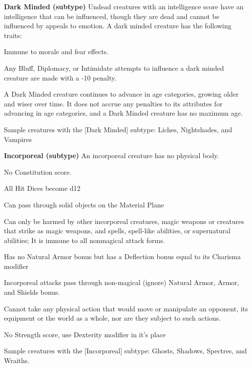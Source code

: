 \textbf{Dark Minded (subtype)}
Undead creatures with an intelligence score have an intelligence that can be influenced, though they are dead and cannot be influenced by appeals to emotion. A dark minded creature has the following traits:
\begin{itemize*}
\item Immune to morale and fear effects.
\item Any Bluff, Diplomacy, or Intimidate attempts to influence a dark minded creature are made with a -10 penalty.
\item A Dark Minded creature continues to advance in age categories, growing older and wiser over time. It does not accrue any penalties to its attributes for advancing in age categories, and a Dark Minded creature has no maximum age.
\item Sample creatures with the [Dark Minded] subtype: Liches, Nightshades, and Vampires
\end{itemize*}

\textbf{Incorporeal (subtype)}
An incorporeal creature has no physical body.
\begin{itemize*}
\item No Constitution score.
\item All Hit Dices become d12
\item Can pass through solid objects on the Material Plane
\item Can only be harmed by other incorporeal creatures, magic weapons or creatures that strike as magic weapons, and spells, spell-like abilities, or supernatural abilities; It is immune to all nonmagical attack forms.
\item Has no Natural Armor bonus but has a Deflection bonus equal to its Charisma modifier
\item Incorporeal attacks pass through non-magical (ignore) Natural Armor, Armor, and Shields bonus.
\item Cannot take any physical action that would move or manipulate an opponent, its equipment or the world as a whole, nor are they subject to such actions.
\item No Strength score, use Dexterity modifier in it's place
\item Sample creatures with the [Incorporeal] subtype: Ghosts, Shadows, Spectres, and Wraiths.
\end{itemize*}

